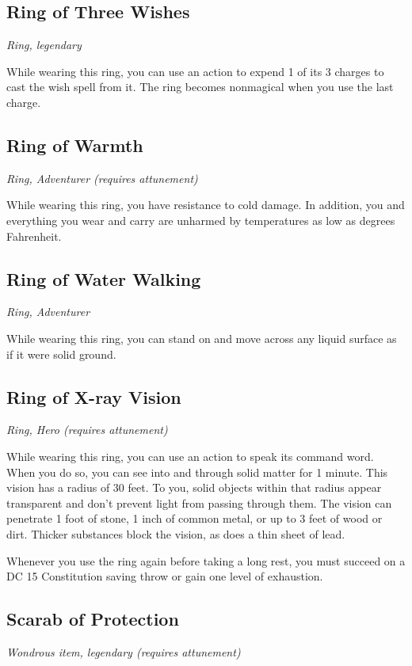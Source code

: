 \subsection{Ring of Three Wishes}
\textit{Ring, legendary}

While wearing this ring, you can use an action to expend 1 of its 3 charges to cast the wish spell from it. The ring becomes nonmagical when you use the last charge.

\subsection{Ring of Warmth}
\textit{Ring, Adventurer (requires attunement)}

While wearing this ring, you have resistance to cold damage. In addition, you and everything you wear and carry are unharmed by temperatures as low as  degrees Fahrenheit.

\subsection{Ring of Water Walking}
\textit{Ring, Adventurer}

While wearing this ring, you can stand on and move across any liquid surface as if it were solid ground.

\subsection{Ring of X-ray Vision}
\textit{Ring, Hero (requires attunement)}

While wearing this ring, you can use an action to speak its command word. When you do so, you can see into and through solid matter for 1 minute. This vision has a radius of 30 feet. To you, solid objects within that radius appear transparent and don't prevent light from passing through them. The vision can penetrate 1 foot of stone, 1 inch of common metal, or up to 3 feet of wood or dirt. Thicker substances block the vision, as does a thin sheet of lead.

Whenever you use the ring again before taking a long rest, you must succeed on a DC 15 Constitution saving throw or gain one level of exhaustion.

\subsection{Scarab of Protection}
\textit{Wondrous item, legendary (requires attunement)}

